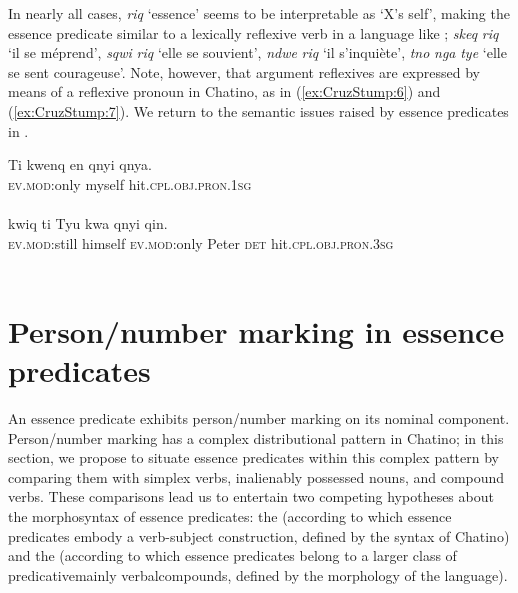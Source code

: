 \documentclass[output=paper]{langsci/langscibook}
\begin{document}
 In nearly all cases, \emph{riq} `essence' seems to be interpretable as `X's self', making the essence predicate
similar to a lexically reflexive verb in a language like ; \emph{skeq} \emph{riq} `il se m\'eprend', \emph{sqwi} \emph{riq}
`elle se souvient', \emph{ndwe} \emph{riq} `il s'inqui\`ete', \emph{tno} \emph{nga} \emph{tye} `elle se sent courageuse'. Note, however,
that argument reflexives are expressed by means of a reflexive pronoun in Chatino, as in (\ref{ex:CruzStump:6}) and (\ref{ex:CruzStump:7}).  We return to the semantic issues raised by essence predicates in .

\ea \label{ex:CruzStump:6}\gll
 {{Ti} } {{kwenq} {en} } {{qnyi} }{qnya}.\\
 {\textsc{ev.mod}:only} {myself} {hit.\textsc{cpl.obj.pron.1sg}}\\
\\

\ex  \label{ex:CruzStump:7} {{kwiq} } {{ti}} {{Tyu}} {{kwa}} {{qnyi} }{qin}.\\
 {\textsc{ev.mod}:still} {himself} {\textsc{ev.mod}:only} {Peter} {\textsc{det}} {hit.\textsc{cpl.obj.pron.3sg}} \\
\\

\z



\section{Person/number marking in essence predicates}

An essence predicate exhibits person/number marking on its nominal component.  Person/number marking has a complex distributional pattern in Chatino; in this section, we propose to situate essence predicates within this complex pattern by comparing them with simplex verbs, inalienably possessed nouns, and compound verbs.  These comparisons lead us to entertain two competing hypotheses about the morphosyntax of essence predicates:  the  (according to which essence predicates embody a verb-subject construction, defined by the syntax of Chatino) and the  (according to which essence predicates belong to a larger class of predicative\textemdash mainly verbal\textemdash compounds, defined by the morphology of the language).
\end{document}
